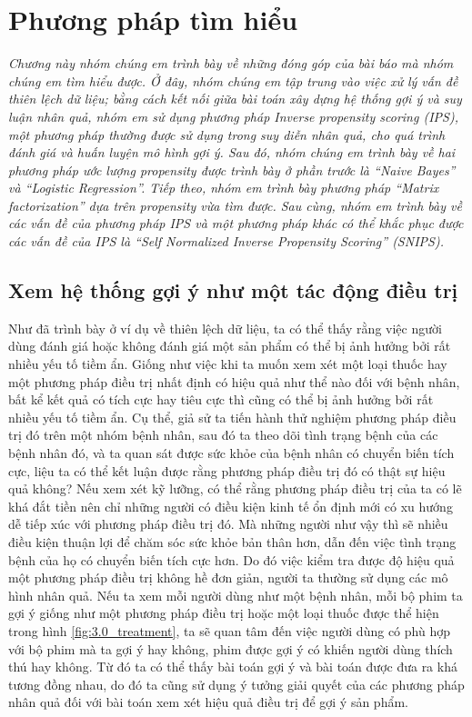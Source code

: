 \chapter{Phương pháp tìm hiểu}
\label{Chapter3}

\noindent\textit{Chương này nhóm chúng em trình bày về những đóng góp của bài báo mà nhóm chúng em tìm hiểu được. Ở đây, nhóm chúng em tập trung vào việc xử lý vấn đề thiên lệch dữ liệu; bằng cách kết nối giữa bài toán xây dựng hệ thống gợi ý và suy luận nhân quả, nhóm em sử dụng phương pháp Inverse propensity scoring (IPS), một phương pháp thường được sử dụng trong suy diễn nhân quả, cho quá trình đánh giá và huấn luyện mô hình gợi ý. Sau đó, nhóm chúng em trình bày về hai phương pháp ước lượng propensity được trình bày ở phần trước là ``Naive Bayes'' và ``Logistic Regression''. Tiếp theo, nhóm em trình bày phương pháp ``Matrix factorization'' dựa trên propensity vừa tìm được. Sau cùng, nhóm em trình bày về các vấn đề của phương pháp IPS và một phương pháp khác có thể khắc phục được các vấn đề của IPS là ``Self Normalized Inverse Propensity Scoring'' (SNIPS).}

\section{Xem hệ thống gợi ý như một tác động điều trị}

Như đã trình bày ở ví dụ về thiên lệch dữ liệu, ta có thể thấy rằng việc người dùng đánh giá hoặc không đánh giá một sản phẩm có thể bị ảnh hưởng bởi rất nhiều yếu tố tiềm ẩn. Giống như việc khi ta muốn xem xét một loại thuốc hay một phương pháp điều trị nhất định có hiệu quả như thể nào đối với bệnh nhân, bất kể kết quả có tích cực hay tiêu cực thì cũng có thể bị ảnh hưởng bởi rất nhiều yếu tố tiềm ẩn. Cụ thể, giả sử ta tiến hành thử nghiệm phương pháp điều trị đó trên một nhóm bệnh nhân, sau đó ta theo dõi tình trạng bệnh của các bệnh nhân đó, và ta quan sát được sức khỏe của bệnh nhân có chuyển biến tích cực, liệu ta có thể kết luận được rằng phương pháp điều trị đó có thật sự hiệu quả không? Nếu xem xét kỹ lưỡng, có thể rằng phương pháp điều trị của ta có lẽ  khá đắt tiền nên chỉ những người có điều kiện kinh tế ổn định mới có xu hướng dễ tiếp xúc với phương pháp điều trị đó. Mà những người như vậy thì sẽ nhiều điều kiện thuận lợi để chăm sóc sức khỏe bản thân hơn, dẫn đến việc tình trạng bệnh của họ có chuyển biến tích cực hơn. Do đó việc kiểm tra được độ hiệu quả một phương pháp điều trị không hề đơn giản, người ta thường sử dụng các mô hình nhân quả. Nếu ta xem mỗi người dùng như một bệnh nhân, mỗi bộ phim ta gợi ý giống như một phương pháp điều trị hoặc một loại thuốc được thể hiện trong hình \ref{fig:3.0_treatment}, ta sẽ quan tâm đến việc người dùng có phù hợp với bộ phim mà ta gợi ý hay không, phim được gợi ý có khiến người dùng thích thú hay không. Từ đó ta có thể thấy bài toán gợi ý và bài toán được đưa ra khá tương đồng nhau, do đó ta cũng sử dụng ý tưởng giải quyết của các phương pháp nhân quả đối với bài toán xem xét hiệu quả điều trị để gợi ý sản phẩm.

